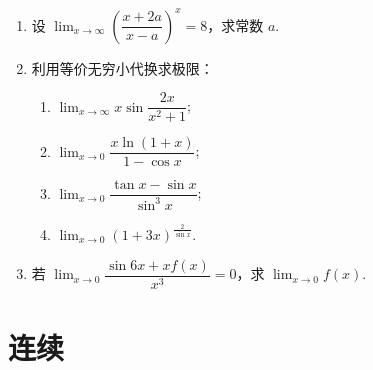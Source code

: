 \begin{enumerate}
    \item 设 $\displaystyle\lim_{x\to\infty}\left(\dfrac{x+2a}{x-a}\right)^x=8$，求常数 $a$.
    
    \item 利用等价无穷小代换求极限：
    \begin{enumerate}[(1)]\setlength{\itemsep}{5pt}\setlength{\topsep}{15pt}
        \item $\displaystyle\lim_{x\to\infty}x\sin\dfrac{2x}{x^2+1}$;
        \item $\displaystyle\lim_{x\to0}\dfrac{x\ln(1+x)}{1-\cos x}$;
        \item $\displaystyle\lim_{x\to0}\dfrac{\tan x-\sin x}{\sin^3x}$;
        \item $\displaystyle\lim_{x\to0}(1+3x)^{\frac{2}{\sin x}}$.
    \end{enumerate}

    \item 若 $\displaystyle\lim_{x\to0}\dfrac{\sin 6x+xf(x)}{x^3}=0$，求 $\displaystyle\lim_{x\to 0}f(x)$.




\end{enumerate}


\section{连续}